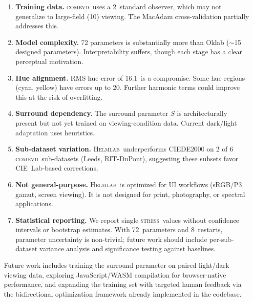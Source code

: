 \documentclass[11pt, twocolumn]{article}
\newcommand{\helmlab}{\textsc{Helmlab}}
\newcommand{\stress}{\textsc{stress}}
\newcommand{\combvd}{\textsc{combvd}}
\begin{document}
\begin{enumerate}
  \item \textbf{Training data.} \combvd\ uses a 2\textdegree\ standard
    observer, which may not generalize to large-field (10\textdegree)
    viewing. The MacAdam cross-validation partially addresses this.

  \item \textbf{Model complexity.} 72 parameters is substantially more
    than Oklab ($\sim$15 designed parameters). Interpretability
    suffers, though each stage has a clear perceptual motivation.

  \item \textbf{Hue alignment.} RMS hue error of 16.1\textdegree\ is
    a compromise. Some hue regions (cyan, yellow) have errors up to
    20\textdegree. Further harmonic terms could improve this at the
    risk of overfitting.

  \item \textbf{Surround dependency.} The surround parameter $S$ is
    architecturally present but not yet trained on viewing-condition
    data. Current dark/light adaptation uses heuristics.

  \item \textbf{Sub-dataset variation.} \helmlab\ underperforms
    CIEDE2000 on 2 of 6 \combvd\ sub-datasets (Leeds, RIT-DuPont),
    suggesting these subsets favor CIE~Lab-based corrections.

  \item \textbf{Not general-purpose.} \helmlab\ is optimized for UI
    workflows (sRGB/P3 gamut, screen viewing). It is not designed for
    print, photography, or spectral applications.

  \item \textbf{Statistical reporting.} We report single \stress\
    values without confidence intervals or bootstrap estimates.
    With 72~parameters and 8~restarts, parameter uncertainty is
    non-trivial; future work should include per-sub-dataset variance
    analysis and significance testing against baselines.
\end{enumerate}

Future work includes training the surround parameter on paired
light/dark viewing data, exploring JavaScript/WASM compilation for
browser-native performance, and expanding the training set with
targeted human feedback via the bidirectional optimization framework
already implemented in the codebase.


\end{document}
